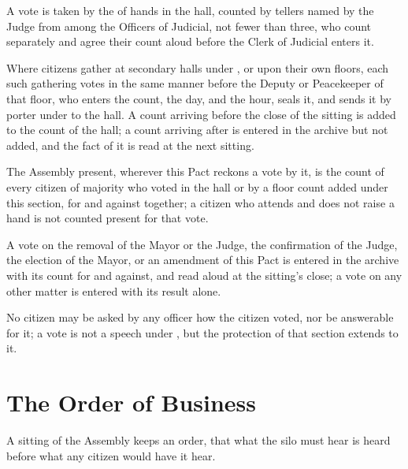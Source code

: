 \begin{clauses}
\item A vote is taken by the  of hands in the hall, counted by tellers named by the Judge from among the Officers of Judicial, not fewer than three, who count separately and agree their count aloud before the Clerk of Judicial enters it.
\item Where citizens gather at secondary halls under , or upon their own floors, each such gathering votes in the same manner before the Deputy or Peacekeeper of that floor, who enters the count, the day, and the hour, seals it, and sends it by porter under  to the hall. A count arriving before the close of the sitting is added to the count of the hall; a count arriving after is entered in the archive but not added, and the fact of it is read at the next sitting.
\item The Assembly present, wherever this Pact reckons a vote by it, is the count of every citizen of majority who voted in the hall or by a floor count added under this section, for and against together; a citizen who attends and does not raise a hand is not counted present for that vote.
\item A vote on the removal of the Mayor or the Judge, the confirmation of the Judge, the election of the Mayor, or an amendment of this Pact is entered in the archive with its count for and against, and read aloud at the sitting's close; a vote on any other matter is entered with its result alone.
\item No citizen may be asked by any officer how the citizen voted, nor be answerable for it; a vote is not a speech under , but the protection of that section extends to it.
\end{clauses}

\section{The Order of Business}
\label{sec:assembly:order-of-business}

A sitting of the Assembly keeps an order, that what the silo must hear is heard before what any citizen would have it hear.


